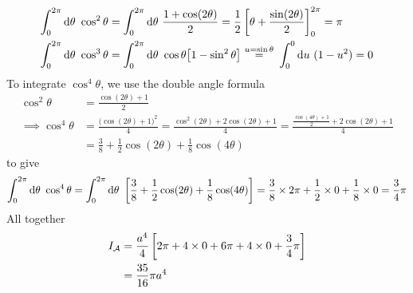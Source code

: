\begin{eg}[Cardioid]
\begin{align*}
\int_0^{2\pi}\dee{\theta}\ \cos^2\theta
     &= \int_0^{2\pi}\dee{\theta}\ \frac{1+\cos(2\theta)}{2}
     = \frac{1}{2}\left[\theta+\frac{\sin(2\theta)}{2}\right]_0^{2\pi}
     =\pi \\
\int_0^{2\pi}\dee{\theta}\ \cos^3\theta
     &= \int_0^{2\pi}\dee{\theta}\ \cos\theta\big[1-\sin^2\theta\big]
      \eqover{u=\sin\theta} \int_0^0\dee{u}\ (1-u^2)
     =0  
\end{align*}
To integrate $\cos^4\theta$, we use the double angle formula
\begin{align*}
\cos^2\theta &=\frac{\cos(2\theta)+1}{2} \\
\implies \cos^4\theta &= \frac{\big(\cos(2\theta)+1\big)^2}{4}
    =\frac{\cos^2(2\theta)+2\cos(2\theta)+1}{4}
    =\frac{\frac{\cos(4\theta)+1}{2}+2\cos(2\theta)+1}{4} \\
   &=\frac{3}{8} +\frac{1}{2}\cos(2\theta) +\frac{1}{8}\cos(4\theta)
\end{align*}
to give
\begin{align*}
\int_0^{2\pi}\mathrm{d}\theta\ \cos^4\theta
=\int_0^{2\pi}\mathrm{d}\theta\ \left[\frac{3}{8} 
         +\frac{1}{2}\cos(2\theta) +\frac{1}{8}\cos(4\theta)\right]
=\frac{3}{8} \times 2\pi +\frac{1}{2}\times 0 +\frac{1}{8}\times 0
=\frac{3}{4}\pi
\end{align*}
All together
\begin{align*}
I_{\mathcal{A}}&= \frac{a^4}{4}\left[2\pi + 4\times 0 +6\pi+4\times 0
                        +\frac{3}{4}\pi\right] \\
   &=\frac{35}{16}\pi a^4
\end{align*}

\end{eg}

